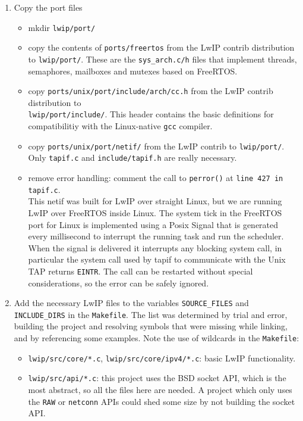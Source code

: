 \begin{enumerate}
    \item Copy the port files
    \begin{itemize}
        \item mkdir \texttt{lwip/port/}
        \item copy the contents of \texttt{ports/freertos} from the LwIP contrib distribution to \texttt{lwip/port/}. These are the \texttt{sys\_arch.c/h} files that implement threads, semaphores, mailboxes and mutexes based on FreeRTOS.
        \item copy \texttt{ports/unix/port/include/arch/cc.h} from the LwIP contrib distribution to\\\texttt{lwip/port/include/}. This header contains the basic definitions for compatibilitiy with the Linux-native \texttt{gcc} compiler.
        \item copy \texttt{ports/unix/port/netif/} from the LwIP contrib to \texttt{lwip/port/}. Only \texttt{tapif.c} and \texttt{include/tapif.h} are really necessary.
        \item remove error handling: comment the call to \texttt{perror()} at \texttt{line 427 in tapif.c}.\\
        This netif was built for LwIP over straight Linux, but we are running LwIP over FreeRTOS inside Linux. The system tick in the FreeRTOS port for Linux is implemented using a Posix Signal that is generated every millisecond to interrupt the running task and run the scheduler. When the signal is delivered it interrupts any blocking system call, in particular the system call used by tapif to communicate with the Unix TAP returns \texttt{EINTR}. The call can be restarted without special considerations, so the error can be safely ignored.
    \end{itemize}
    \item Add the necessary LwIP files to the variables \texttt{SOURCE\_FILES} and \texttt{INCLUDE\_DIRS} in the \texttt{Makefile}. The list was determined by trial and error, building the project and resolving symbols that were missing while linking, and by referencing some examples. Note the use of wildcards in the \texttt{Makefile}:
    \begin{itemize}
        \item \texttt{lwip/src/core/*.c}, \texttt{lwip/src/core/ipv4/*.c}: basic LwIP functionality.
        \item \texttt{lwip/src/api/*.c}: this project uses the BSD socket API, which is the most abstract, so all the files here are needed. A project which only uses the \texttt{RAW} or \texttt{netconn} APIs could shed some size by not building the socket API.

\end{itemize}
\end{enumerate}

